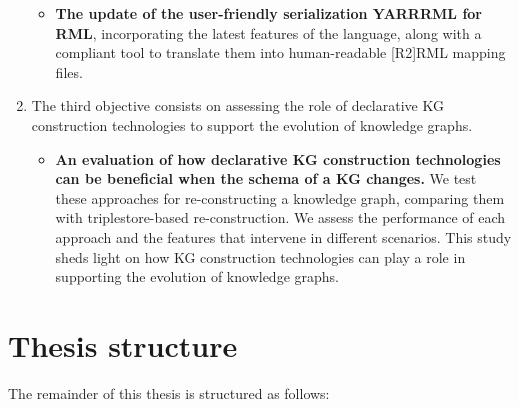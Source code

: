 \begin{enumerate}
\begin{itemize}
        \item \textbf{The update of the user-friendly serialization YARRRML for RML}, incorporating the latest features of the language, along with a compliant tool to translate them into human-readable [R2]RML mapping files. 
    \end{itemize}

    \item The third objective consists on assessing the role of declarative KG construction technologies to support the evolution of knowledge graphs.

    \begin{itemize}
        \item \textbf{An evaluation of how declarative KG construction technologies can be beneficial when the schema of a KG changes.} We test these approaches for re-constructing a knowledge graph, comparing them with triplestore-based re-construction. We assess the performance of each approach and the features that intervene in different scenarios. This study sheds light on how KG construction technologies can play a role in supporting the evolution of knowledge graphs.
        
    \end{itemize}
\end{enumerate}


\section{Thesis structure}

The remainder of this thesis is structured as follows:

